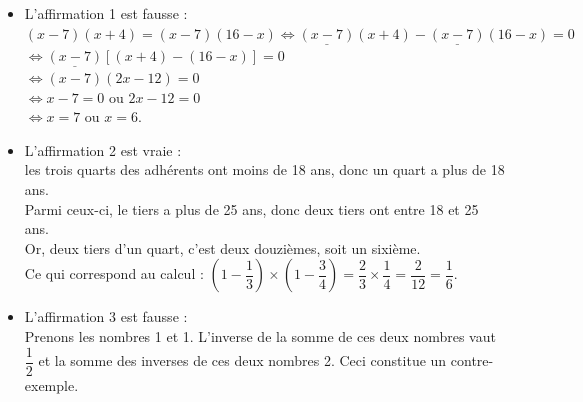 \begin{corrige}
   \begin{itemize}
      \item {\blue L'affirmation 1 est fausse} : \\
         $(x - 7)(x + 4) =(x -7)(16 - x) \iff \underline{(x - 7)}(x + 4) -\underline{(x -7)}(16 - x) =0$ \\
         \hspace*{4.6cm} $\iff \underline{(x - 7)}[(x + 4) -(16 - x)] =0$ \\
         \hspace*{4.6cm} $ \iff (x - 7)(2x-12) =0$ \\
         \hspace*{4.6cm} $ \iff x-7 =0 \text{ ou } 2x-12 =0$ \\
         \hspace*{4.6cm} $ \iff x =7 \text{ ou } x =6$.
      \item {\blue L'affirmation 2 est vraie} : \\
         les trois quarts des adhérents ont moins de 18 ans, donc un quart a plus de 18 ans. \\
         Parmi ceux-ci, le tiers a plus de 25 ans, donc deux tiers ont entre 18 et 25 ans. \\
         Or, deux tiers d'un quart, c'est deux douzièmes, soit un sixième. \\ [1mm]
         Ce qui correspond au calcul : $\left(1-\dfrac13\right)\times\left(1-\dfrac34\right) =\dfrac23\times\dfrac14 =\dfrac2{12} =\dfrac16$.
      \item {\blue L'affirmation 3 est fausse} : \\
         Prenons les nombres 1 et 1. L'inverse de la somme de ces deux nombres vaut $\dfrac12$ et la somme des inverses de ces deux nombres 2. Ceci constitue un contre-exemple.
   \end{itemize}
\end{corrige}


\bigskip


